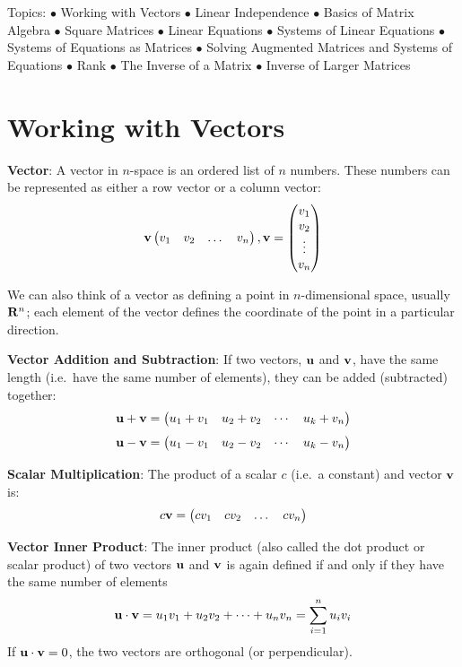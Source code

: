 \documentclass[
]{book}
\theoremstyle{definition}
\theoremstyle{definition}
\theoremstyle{definition}
\theoremstyle{definition}
\theoremstyle{remark}
\begin{document}
Topics:
\(\bullet\) Working with Vectors
\(\bullet\) Linear Independence
\(\bullet\) Basics of Matrix Algebra
\(\bullet\) Square Matrices
\(\bullet\) Linear Equations
\(\bullet\) Systems of Linear Equations
\(\bullet\) Systems of Equations as Matrices
\(\bullet\) Solving Augmented Matrices and Systems of Equations
\(\bullet\) Rank
\(\bullet\) The Inverse of a Matrix
\(\bullet\) Inverse of Larger Matrices

\hypertarget{vector-def}{%
\section{Working with Vectors}\label{vector-def}}

\textbf{Vector}: A vector in \(n\)-space is an ordered list of \(n\) numbers. These numbers can be represented as either a row vector or a column vector:
\[ {\bf v} \begin{pmatrix} v_1 & v_2 & \dots & v_n\end{pmatrix} , {\bf v} = \begin{pmatrix} v_1 \\ v_2 \\ \vdots \\ v_n \end{pmatrix}\]

We can also think of a vector as defining a point in \(n\)-dimensional space, usually \({\bf R}^n\); each element of the vector defines the coordinate of the point in a particular direction.

\textbf{Vector Addition and Subtraction}: If two vectors, \({\bf u}\) and \({\bf v}\), have the same length (i.e.~have the same number of elements), they can be added (subtracted) together:
\[ {\bf u} + {\bf v} = \begin{pmatrix} u_1 + v_1 & u_2 + v_2 & \cdots & u_k + v_n \end{pmatrix}\]
\[ {\bf u} - {\bf v} = \begin{pmatrix} u_1 - v_1 & u_2 - v_2 & \cdots & u_k - v_n \end{pmatrix}\]

\textbf{Scalar Multiplication}: The product of a scalar \(c\) (i.e.~a constant) and vector \({\bf v}\) is:\\
\[ c{\bf v} =  \begin{pmatrix} cv_1 & cv_2 & \dots & cv_n \end{pmatrix} \]

\textbf{Vector Inner Product}: The inner product (also called the dot product or scalar product) of two vectors \({\bf u}\) and \({\bf v}\) is again defined if and only if they have the same number of elements
\[ {\bf u} \cdot {\bf v} = u_1v_1 + u_2v_2 + \cdots + u_nv_n = \sum_{i = 1}^n u_iv_i\]
If \({\bf u} \cdot {\bf v} = 0\), the two vectors are orthogonal (or perpendicular).
\end{document}
